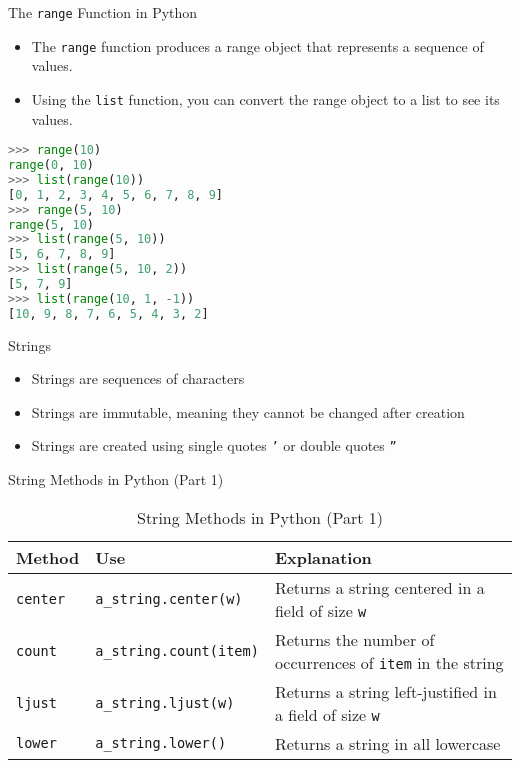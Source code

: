 \begin{frame}[fragile]{The \texttt{range} Function in Python}
    \begin{itemize}
        \item The \texttt{range} function produces a range object that represents a sequence of values.
        \item Using the \texttt{list} function, you can convert the range object to a list to see its values.
    \end{itemize}
    \begin{lstlisting}[style=colorful, language=Python]
>>> range(10)
range(0, 10)
>>> list(range(10))
[0, 1, 2, 3, 4, 5, 6, 7, 8, 9]
>>> range(5, 10)
range(5, 10)
>>> list(range(5, 10))
[5, 6, 7, 8, 9]
>>> list(range(5, 10, 2))
[5, 7, 9]
>>> list(range(10, 1, -1))
[10, 9, 8, 7, 6, 5, 4, 3, 2]
    \end{lstlisting}
\end{frame}

\begin{frame}{Strings}
    \begin{itemize}
        \item Strings are sequences of characters
        \item Strings are immutable, meaning they cannot be changed after creation
        \item Strings are created using single quotes \texttt{'} or double quotes \texttt{''}
    \end{itemize}
\end{frame}     

\begin{frame}{String Methods in Python (Part 1)}
    \begin{table}[]
        \centering
        \begin{tabular}{|l|l|p{5cm}|}
            \hline
            \textbf{Method} & \textbf{Use} & \textbf{Explanation} \\ \hline
            \texttt{center} & \texttt{a\_string.center(w)} & Returns a string centered in a field of size \texttt{w} \\ \hline
            \texttt{count} & \texttt{a\_string.count(item)} & Returns the number of occurrences of \texttt{item} in the string \\ \hline
            \texttt{ljust} & \texttt{a\_string.ljust(w)} & Returns a string left-justified in a field of size \texttt{w} \\ \hline
            \texttt{lower} & \texttt{a\_string.lower()} & Returns a string in all lowercase \\ \hline
        \end{tabular}
        \caption{String Methods in Python (Part 1)}
    \end{table}
\end{frame}

